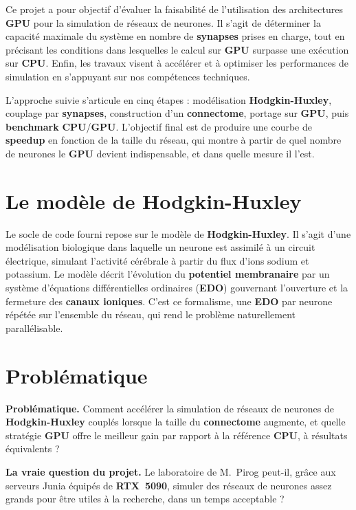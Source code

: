 \documentclass{report}
\begin{document}
Ce projet a pour objectif d'évaluer la faisabilité de l'utilisation des architectures \textbf{GPU} pour la simulation de réseaux de neurones. Il s'agit de déterminer la capacité maximale du système en nombre de \textbf{synapses} prises en charge, tout en précisant les conditions dans lesquelles le calcul sur \textbf{GPU} surpasse une exécution sur \textbf{CPU}. Enfin, les travaux visent à accélérer et à optimiser les performances de simulation en s'appuyant sur nos compétences techniques.

L'approche suivie s'articule en cinq étapes : modélisation \textbf{Hodgkin-Huxley}, couplage par \textbf{synapses}, construction d'un \textbf{connectome}, portage sur \textbf{GPU}, puis \textbf{benchmark} \textbf{CPU}/\textbf{GPU}. L'objectif final est de produire une courbe de \textbf{speedup} en fonction de la taille du réseau, qui montre à partir de quel nombre de neurones le \textbf{GPU} devient indispensable, et dans quelle mesure il l'est.

\section{Le modèle de Hodgkin-Huxley}

Le socle de code fourni repose sur le modèle de \textbf{Hodgkin-Huxley}. Il s'agit d'une modélisation biologique dans laquelle un neurone est assimilé à un circuit électrique, simulant l'activité cérébrale à partir du flux d'ions sodium et potassium. Le modèle décrit l'évolution du \textbf{potentiel membranaire} par un système d'équations différentielles ordinaires (\textbf{EDO}) gouvernant l'ouverture et la fermeture des \textbf{canaux ioniques}. C'est ce formalisme, une \textbf{EDO} par neurone répétée sur l'ensemble du réseau, qui rend le problème naturellement parallélisable.

\section{Problématique}

\textbf{Problématique.} Comment accélérer la simulation de réseaux de neurones de \textbf{Hodgkin-Huxley} couplés lorsque la taille du \textbf{connectome} augmente, et quelle stratégie \textbf{GPU} offre le meilleur gain par rapport à la référence \textbf{CPU}, à résultats équivalents ?

\textbf{La vraie question du projet.} Le laboratoire de M.~Pirog peut-il, grâce aux serveurs Junia équipés de \textbf{RTX~5090}, simuler des réseaux de neurones assez grands pour être utiles à la recherche, dans un temps acceptable ?
\end{document}
